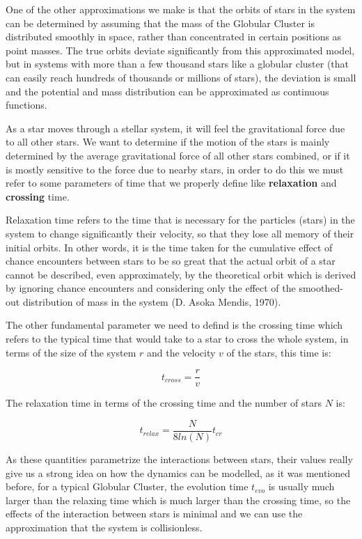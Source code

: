 One of the other approximations we make is that the orbits of stars in the system can be determined by assuming that the mass of the Globular Cluster is distributed smoothly in space, rather than concentrated in certain positions as point masses. The true orbits deviate significantly from this approximated model, but in systems with more than a few thousand stars like a globular cluster (that can easily reach hundreds of thousands or millions of stars), the deviation is small and the potential and mass distribution can be approximated as continuous functions. 

As a star moves through a stellar system, it will feel the gravitational force due to all other stars. We want to determine if the motion of the stars is mainly determined by the average gravitational force of all other stars combined, or if it is mostly sensitive to the force due to nearby stars, in order to do this we must refer to some parameters of time that we properly define like \textbf{relaxation} and \textbf{crossing} time. 

Relaxation time refers to the time that is necessary for the particles (stars) in the system to change significantly their velocity, so that they lose all memory of their initial orbits. In other words, it is the time taken for the cumulative effect of chance encounters between stars to be so great that the actual orbit of a star cannot be described, even approximately, by the theoretical orbit which is derived by ignoring chance encounters and considering only the effect of the smoothed-out distribution of mass in the system (D. Asoka Mendis, 1970). 

The other fundamental parameter we need to defind is the crossing time which refers to the typical time that would take to a star to cross the whole system, in terms of the size of the system $r$ and the velocity $v$ of the stars, this time is:

\begin{equation}
t_{cross}=\frac{r}{v}
\end{equation}

The relaxation time in terms of the crossing time and the number of stars $N$ is:

\begin{equation}
t_{relax}=\frac{N}{8ln(N)}t_{cr}
\end{equation}

As these quantities parametrize the interactions between stars, their values really give us a strong idea on how the dynamics can be modelled, as it was mentioned before, for a typical Globular Cluster, the evolution time $t_{evo}$ is usually much larger than the relaxing time which is much larger than the crossing time, so the effects of the interaction between stars is minimal and we can use the approximation that the system is collisionless.

